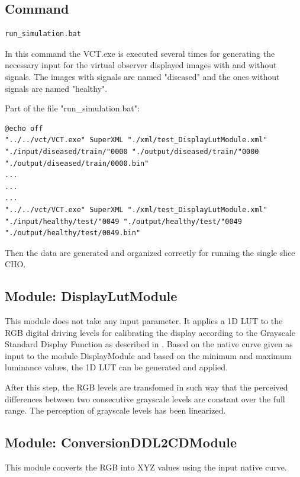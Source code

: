 \subsection{Command}

\lstset{language=C++}
\begin{lstlisting}
run_simulation.bat
\end{lstlisting}

In this command the VCT.exe is executed several times for generating the necessary input for the virtual observer displayed images with and without signals. The images with signals are named "diseased" and the ones without signals are named "healthy".

Part of the file "run\_simulation.bat":

\lstset{language=C++}
\begin{lstlisting}
@echo off
"../../vct/VCT.exe" SuperXML "./xml/test_DisplayLutModule.xml" "./input/diseased/train/"0000 "./output/diseased/train/"0000 "./output/diseased/train/0000.bin"
...
...
...
"../../vct/VCT.exe" SuperXML "./xml/test_DisplayLutModule.xml" "./input/healthy/test/"0049 "./output/healthy/test/"0049 "./output/healthy/test/0049.bin"
\end{lstlisting}

Then the data are generated and organized correctly for running the single slice CHO.

\subsection{Module: DisplayLutModule}

This module does not take any input parameter. It applies a 1D LUT to the RGB digital driving levels for calibrating the display according to the Grayscale Standard Display Function as described in \cite{DIC98}. Based on the native curve given as input to the module DisplayModule and based on the minimum and maximum luminance values, the 1D LUT can be generated and applied.

After this step, the RGB levels are transfomed in such way that the perceived differences between two consecutive grayscale levels are constant over the full range. The perception of grayscale levels has been linearized.

\subsection{Module: ConversionDDL2CDModule}

This module converts the RGB into XYZ values using the input native curve.

